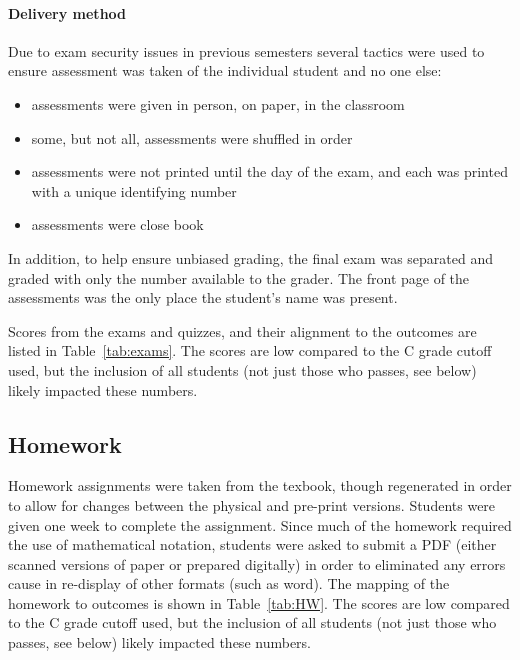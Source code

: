\documentclass[11pt]{article}
\begin{document}
\paragraph{Delivery method} 
Due to exam security issues in previous semesters several tactics were used to ensure assessment was taken of the individual student and no one else: 
\begin{itemize}
\item assessments were given in person, on paper, in the classroom
\item some, but not all, assessments were shuffled in order
\item assessments were not printed until the day of the exam, and each was printed with a unique identifying number
\item assessments were close book 
\end{itemize}

In addition, to help ensure unbiased grading, the final exam was separated and graded with only the number available to the grader. 
The front page of the assessments was the only place the student's name was present. 


Scores from the exams and quizzes, and their alignment to the outcomes are listed in Table~\ref{tab:exams}.
The scores are low compared to the C grade cutoff used, but the inclusion of all students (not just those who passes, see below) likely impacted these numbers. 




\subsection{Homework}
Homework assignments were taken from the texbook, though regenerated in order to allow for changes between the physical and pre-print versions. 
Students were given one week to complete the assignment. 
Since much of the homework required the use of mathematical notation, students were asked to submit a PDF (either scanned versions of paper or prepared digitally) in order to eliminated any errors cause in re-display of other formats (such as word). 
The mapping of the homework to outcomes is shown in Table~\ref{tab:HW}. 
The scores are low compared to the C grade cutoff used, but the inclusion of all students (not just those who passes, see below) likely impacted these numbers. 
\end{document}
